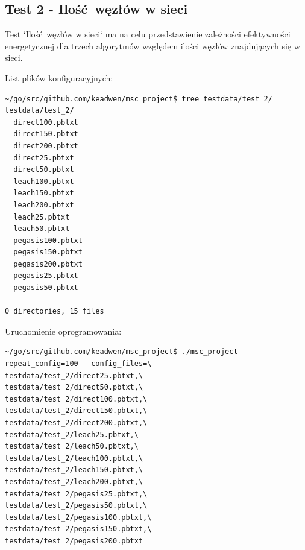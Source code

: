 \documentclass[a4paper,12pt,twoside,openany]{report}
\begin{document}
\subsection{Test 2 - Ilość węzłów w sieci}

Test `Ilość węzłów w sieci` ma na celu przedstawienie zależności efektywności energetycznej dla trzech algorytmów względem ilości węzłów znajdujących się w sieci.

List plików konfiguracyjnych:
\begin{lstlisting}
~/go/src/github.com/keadwen/msc_project$ tree testdata/test_2/
testdata/test_2/
  direct100.pbtxt
  direct150.pbtxt
  direct200.pbtxt
  direct25.pbtxt
  direct50.pbtxt
  leach100.pbtxt
  leach150.pbtxt
  leach200.pbtxt
  leach25.pbtxt
  leach50.pbtxt
  pegasis100.pbtxt
  pegasis150.pbtxt
  pegasis200.pbtxt
  pegasis25.pbtxt
  pegasis50.pbtxt

0 directories, 15 files
\end{lstlisting}

Uruchomienie oprogramowania:

\begin{lstlisting}
~/go/src/github.com/keadwen/msc_project$ ./msc_project --repeat_config=100 --config_files=\
testdata/test_2/direct25.pbtxt,\
testdata/test_2/direct50.pbtxt,\
testdata/test_2/direct100.pbtxt,\
testdata/test_2/direct150.pbtxt,\
testdata/test_2/direct200.pbtxt,\
testdata/test_2/leach25.pbtxt,\
testdata/test_2/leach50.pbtxt,\
testdata/test_2/leach100.pbtxt,\
testdata/test_2/leach150.pbtxt,\
testdata/test_2/leach200.pbtxt,\
testdata/test_2/pegasis25.pbtxt,\
testdata/test_2/pegasis50.pbtxt,\
testdata/test_2/pegasis100.pbtxt,\
testdata/test_2/pegasis150.pbtxt,\
testdata/test_2/pegasis200.pbtxt
\end{lstlisting}
\end{document}
